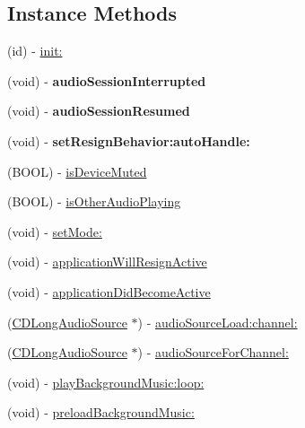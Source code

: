 \subsection*{Instance Methods}
\begin{DoxyCompactItemize}
\item 
(id) -\/ \hyperlink{interfaceCDAudioManager_ae2d8ef3daed8297ee37cd14b67687407}{init\+:}
\item 
\mbox{\label{interfaceCDAudioManager_aeeaf362faad4417ac15d22e0862c1641}} 
(void) -\/ {\bfseries audio\+Session\+Interrupted}
\item 
\mbox{\label{interfaceCDAudioManager_a844dd2990cbadb04e35364abed23f690}} 
(void) -\/ {\bfseries audio\+Session\+Resumed}
\item 
\mbox{\label{interfaceCDAudioManager_a861e77b8bef383849bc2335eaec5bff8}} 
(void) -\/ {\bfseries set\+Resign\+Behavior\+:auto\+Handle\+:}
\item 
(B\+O\+OL) -\/ \hyperlink{interfaceCDAudioManager_a5a4df8bc83cbc6e6723196d3d4ec4974}{is\+Device\+Muted}
\item 
(B\+O\+OL) -\/ \hyperlink{interfaceCDAudioManager_ab664b34e99f6f3e2158f2df910cf3a95}{is\+Other\+Audio\+Playing}
\item 
(void) -\/ \hyperlink{interfaceCDAudioManager_a72fd182d62cc75dfa3701da4a5d97346}{set\+Mode\+:}
\item 
(void) -\/ \hyperlink{interfaceCDAudioManager_a5265cc9a823688a547aa60e8995ba423}{application\+Will\+Resign\+Active}
\item 
(void) -\/ \hyperlink{interfaceCDAudioManager_aa572c7a296c0b2de3564f8da368835ef}{application\+Did\+Become\+Active}
\item 
(\hyperlink{interfaceCDLongAudioSource}{C\+D\+Long\+Audio\+Source} $\ast$) -\/ \hyperlink{interfaceCDAudioManager_aa3a8d9a65c6adbe4717435ea3ccc55ed}{audio\+Source\+Load\+:channel\+:}
\item 
(\hyperlink{interfaceCDLongAudioSource}{C\+D\+Long\+Audio\+Source} $\ast$) -\/ \hyperlink{interfaceCDAudioManager_a07c2429b4ae8340c5aefe21c381f102f}{audio\+Source\+For\+Channel\+:}
\item 
(void) -\/ \hyperlink{interfaceCDAudioManager_a940bfd555f763ee56217b6d589cb6a30}{play\+Background\+Music\+:loop\+:}
\item 
(void) -\/ \hyperlink{interfaceCDAudioManager_a613d13a6227a90dd5a073dbde1ac447b}{preload\+Background\+Music\+:}

\end{DoxyCompactItemize}
